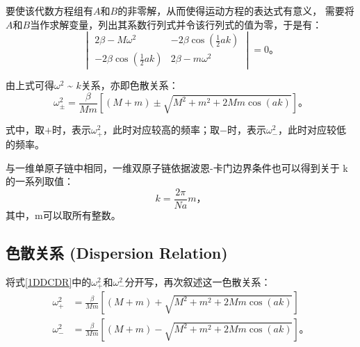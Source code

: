 \documentclass[declarePage]{ecnuthesis}
\begin{document}
要使该代数方程组有$A$和$B$的非零解，从而使得运动方程的表达式有意义，%
需要将$A$和$B$当作求解变量，列出其系数行列式并令该行列式的值为零，于是有：
\begin{equation}
    \begin{vmatrix}
        2 \beta - M \omega ^2 & -2 \beta \cos (\frac{1}{2}ak)\\
        -2\beta\cos (\frac{1}{2}ak) & 2\beta - m \omega ^2
    \end{vmatrix}
    =0 \text{。}
\end{equation}

由上式可得$\omega^2$ \~{} $k$关系，亦即色散关系：
\begin{equation}
    \omega^2_\pm=\frac{\beta}{Mm}[(M+m)\pm\sqrt{M^2+m^2+2Mm\cos(ak)}] \text{。} \label{1DDCDR}
\end{equation}

式中，取$+$时，表示$\omega_+^2$，此时对应较高的频率；取$-$时，表示$\omega_-^2$，此时对应较低的频率。

与一维单原子链中相同，一维双原子链依据波恩-卡门边界条件也可以得到关于 k 的一系列取值：
\begin{equation}
    k = \frac{2\pi}{Na}m \text{，} \label{1DDCK}
\end{equation}
其中，m可以取所有整数。

\subsection{色散关系 (Dispersion Relation)}

将式\ref{1DDCDR}中的$\omega_+^2$和$\omega_-^2$分开写，再次叙述这一色散关系：
\begin{align}
    \omega^2_+&=\frac{\beta}{Mm}[(M+m)+\sqrt{M^2+m^2+2Mm\cos(ak)}]\\
    \omega^2_-&=\frac{\beta}{Mm}[(M+m)-\sqrt{M^2+m^2+2Mm\cos(ak)}] \text{。}
\end{align}

\backmatter
\PrintReference
\end{document}
